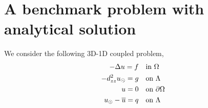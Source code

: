 \documentclass[r]{siamart171218}
\begin{document}





\section{A benchmark problem with analytical solution}

We consider the following 3D-1D coupled problem,
\begin{subequations}\label{benchmark}
\begin{align}
\label{benchm_3d}
-\Delta u=f \quad &\text{in $\Omega$}\\
\label{benchm_1d}
-d_{zz}^2 \ud =g \quad &\text{on $\Lambda$}\\
u=0 \quad &\text{on $\partial \Omega$}\\
\label{benchm_coupl}
\ud -\avrc{u}=q \quad &\text{on $\Lambda$}
\end{align}
\end{subequations}
\end{document}
